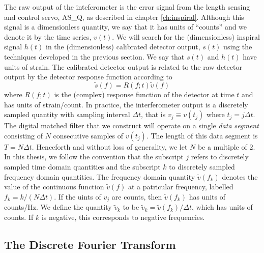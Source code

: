 The raw output of the inteferometer is the error signal from the length
sensing and control servo, AS\_Q, as described in chapter \ref{ch:inspiral}.
Although this signal is a dimensionless quantity, we say that it has units of
``counts'' and we denote it by the time series, $v(t)$.  We will search for
the (dimensionless) inspiral signal $h(t)$ in the (dimensionless) calibrated
detector output, $s(t)$ using the techniques developed in the previous
section. We say that $s(t)$ and $h(t)$ have units of strain. The calibrated
detector output is related to the raw detector output by the detector response
function according
to \begin{equation}
\tilde{s}(f) = R(f;t) \tilde{v}(f)
\end{equation}
where $R(f;t)$ is the (complex) response function of the detector at time
$t$\cite{Adhikari:2003} and has units of strain/count.  In practice, the
interferometer output is a discretely sampled quantity with sampling interval
$\Delta t$, that is $v_j \equiv v(t_j)$ where $t_j = j\Delta t$.  The digital
matched filter that we construct will operate on a single \emph{data segment}
consisting of $N$ consecutive samples of $v(t_j)$. The length of this data
segment is $T = N\Delta t$.  Henceforth and without loss of generality, we let
$N$ be a multiple of $2$.  In this thesis, we follow the convention that the
subscript $j$ refers to discretely sampled time domain quantities and the
subscript $k$ to discretely sampled frequency domain quantities.  The
frequency domain quantity $\tilde{v}(f_k)$ denotes the value of the continuous
function $\tilde{v}(f)$ at a patricular frequency, labelled $f_k = k/(N\Delta
t)$. If the uints of $v_j$ are counts, then $\tilde{v}(f_k)$ has units of
counts/Hz. We define the quantity $\tilde{v}_k$ to be $\tilde{v}_k =
\tilde{v}(f_k) / \Delta t$, which has units of counts. If $k$ is negative,
this corresponds to negative frequencies.

\subsection{The Discrete Fourier Transform}
\label{ss:dft}

